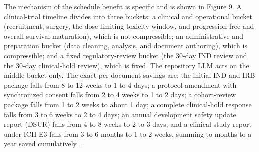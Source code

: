 The mechanism of the schedule benefit is specific and is shown in Figure 9. A
clinical-trial timeline divides into three buckets: a clinical and operational
bucket (recruitment, surgery, the dose-limiting-toxicity window, and
progression-free and overall-survival maturation), which is not compressible; an
administrative and preparation bucket (data cleaning, analysis, and document
authoring), which is compressible; and a fixed regulatory-review bucket (the 30-day
IND review and the 30-day clinical-hold review), which is fixed. The repository LLM
acts on the middle bucket only. The exact per-document savings are: the initial IND
and IRB package falls from 8 to 12 weeks to 1 to 4 days; a protocol amendment with
synchronized consent falls from 2 to 4 weeks to 1 to 2 days; a cohort-review package
falls from 1 to 2 weeks to about 1 day; a complete clinical-hold response falls from
3 to 6 weeks to 2 to 4 days; an annual development safety update report (DSUR) falls
from 4 to 8 weeks to 2 to 3 days; and a clinical study report under ICH E3 falls
from 3 to 6 months to 1 to 2 weeks, summing to months to a year saved cumulatively
\cite{paipredict4x,paisitedocpk}.

